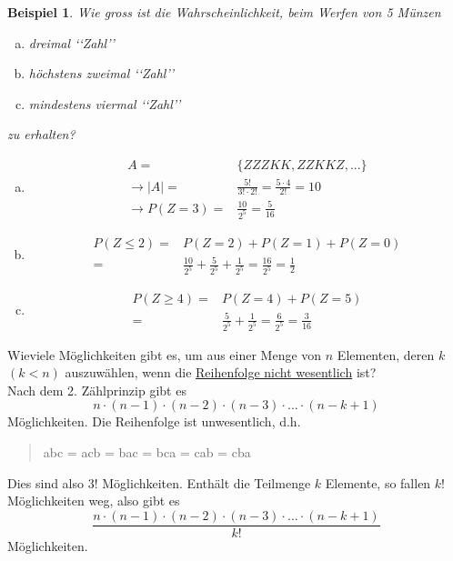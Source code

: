\documentclass{report}
\newtheorem{myexample}{Beispiel}
\begin{document}
\begin{myexample}
Wie gross ist die Wahrscheinlichkeit, beim Werfen von 5 Münzen
\begin{enumerate}[(a)]
\item
dreimal \lq\lq{}Zahl\rq\rq{}
\item
höchstens zweimal \lq\lq{}Zahl\rq\rq{}
\item
mindestens viermal \lq\lq{}Zahl\rq\rq{}
\end{enumerate}
zu erhalten?
\begin{enumerate}[(a)]
\item
\begin{align*}
A = & \{ZZZKK, ZZKKZ, ... \}\\
\longrightarrow |A| = & \frac{5!}{3! \cdot 2!} = \frac{5 \cdot 4}{2!} = 10\\
\longrightarrow P(Z=3) = & \frac{10}{2^5} = \frac{5}{16}
\end{align*}
\item
\begin{align*}
P(Z \leq 2) = & P(Z=2) + P(Z=1) + P(Z=0)\\
= & \frac{10}{2^5} + \frac{5}{2^5} + \frac{1}{2^5} = \frac{16}{2^5} = \frac{1}{2}
\end{align*}
\item
\begin{align*}
P(Z \geq 4) = & P(Z=4) + P(Z=5)\\
= & \frac{5}{2^5} + \frac{1}{2^5} = \frac{6}{2^5} = \frac{3}{16}
\end{align*}
\end{enumerate}
\end{myexample}
Wieviele Möglichkeiten gibt es, um aus einer Menge von $n$ Elementen, deren $k$ $(k < n)$ auszuwählen, wenn die \underline{Reihenfolge nicht wesentlich} ist?\\
Nach dem 2. Zählprinzip gibt es
\begin{equation}
n \cdot (n-1) \cdot (n-2) \cdot (n-3) \cdot ... \cdot (n-k+1)
\end{equation}
Möglichkeiten. Die Reihenfolge ist unwesentlich, d.h.
\begin{quote}
abc = acb = bac = bca = cab = cba
\end{quote}
Dies sind also $3!$ Möglichkeiten. Enthält die Teilmenge $k$ Elemente, so fallen $k!$ Möglichkeiten weg, also gibt es
\begin{equation}
\frac{n \cdot (n-1) \cdot (n-2) \cdot (n-3) \cdot ... \cdot (n-k+1)}{k!}
\end{equation}
Möglichkeiten.
\end{document}
